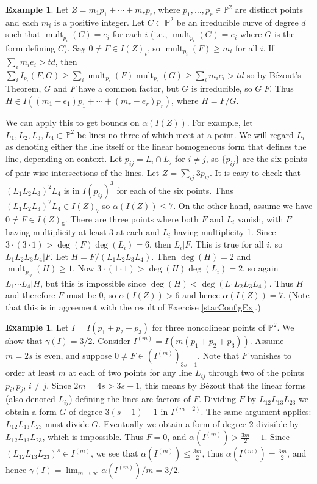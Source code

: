 \documentclass[11pt,twoside]{amsart}
\numberwithin{equation}{section}
\theoremstyle{definition}
\newtheorem{example}[theorem]{Example}
\begin{document}
\begin{example}\label{AlphaAndBezout}
Let $Z=m_1p_1+\cdots+m_rp_r$, where $p_1,\ldots,p_r\in{\mathbb{P}^{2}}$ 
are distinct points and each $m_i$ is a positive integer.
Let $C\subset{\mathbb{P}^{2}}$ be an irreducible curve of degree $d$
such that ${\operatorname{mult}}_{p_i}(C)=e_i$ for each $i$ (i.e., ${\operatorname{mult}}_{p_i}(G)=e_i$
where $G$ is the form defining $C$).
Say $0\neq F\in I(Z)_t$, so ${\operatorname{mult}}_{p_i}(F)\geq m_i$ for all $i$.
If $\sum_im_ie_i>td$, then
$\sum_iI_{p_i}(F,G)\geq \sum_i{\operatorname{mult}}_{p_i}(F){\operatorname{mult}}_{p_i}(G)\geq\sum_im_ie_i > td$ so by B\'ezout's Theorem,
$G$ and $F$ have a common factor, but $G$ is irreducible, so
$G|F$. Thus $H\in I((m_1-e_1)p_1+\cdots+(m_r-e_r)p_r)$,
where $H=F/G$. 

We can apply this to get bounds on $\alpha(I(Z))$.
For example, let $L_1,L_2,L_3,L_4\subset{\mathbb{P}^{2}}$ be lines no three of which meet at a point.
We will regard $L_i$ as denoting either the line itself or the linear homogeneous form that defines the line,
depending on context.
Let $p_{ij}=L_i\cap L_j$ for $i\neq j$, so $\{p_{ij}\}$ are the six points of pair-wise intersections of the lines.
Let $Z=\sum_{ij}3p_{ij}$. It is easy to check that $(L_1L_2L_3)^2L_4$ is in $I(p_{ij})^3$ for each of the
six points. Thus $(L_1L_2L_3)^2L_4\in I(Z)_7$ so $\alpha(I(Z))\leq 7$.
On the other hand, assume we have $0\neq F\in I(Z)_6$.
There are three points where both $F$ and $L_i$ vanish, with $F$ 
having multiplicity at least 3 at each and $L_i$ having multiplicity 1.
Since $3\cdot (3\cdot 1)>\deg(F)\deg(L_i)=6$, then $L_i|F$. This is true for all
$i$, so $L_1L_2L_3L_4|F$. Let $H=F/(L_1L_2L_3L_4)$.
Then $\deg(H)=2$ and ${\operatorname{mult}}_{p_{ij}}(H)\geq 1$.
Now $3\cdot (1\cdot 1)>\deg(H)\deg(L_i)=2$, so again
$L_1\cdots L_4|H$, but this is impossible since $\deg(H)<\deg(L_1L_2L_3L_4)$.
Thus $H$ and therefore $F$ must be 0,
so $\alpha(I(Z))>6$ and hence $\alpha(I(Z))=7$.
(Note that this is in agreement with the result of Exercise \ref{starConfigEx}.)
\end{example}

\begin{example}
Let $I=I(p_1+p_2+p_3)$ for three noncolinear points of ${\mathbb{P}^{2}}$.
We show that $\gamma(I)=3/2$. Consider $I^{(m)}=I(m(p_1+p_2+p_3))$.
Assume $m=2s$ is even, and suppose $0\neq F\in (I^{(m)})_{3s-1}$.
Note that $F$ vanishes to order at least $m$ at each of two points
for any line $L_{ij}$ through two of the points $p_i, p_j$, $i\neq j$.
Since $2m=4s>3s-1$, this means by B\'ezout that the linear forms (also denoted $L_{ij}$)
defining the lines are factors of
$F$. Dividing $F$ by $L_{12}L_{13}L_{23}$ we obtain a form $G$ of degree $3(s-1)-1$
in $I^{(m-2)}$. The same argument applies: $L_{12}L_{13}L_{23}$ must divide $G$.
Eventually we obtain a form of degree 2 divisible by $L_{12}L_{13}L_{23}$, which is impossible.
Thus $F=0$, and $\alpha(I^{(m)})> \frac{3m}{2}-1$. Since $(L_{12}L_{13}L_{23})^s\in I^{(m)}$,
we see that $\alpha(I^{(m)})\leq \frac{3m}{2}$, thus $\alpha(I^{(m)})=\frac{3m}{2}$, and hence
$\gamma(I)=\lim_{m\to\infty}\alpha(I^{(m)})/m=3/2$.
\end{example}
\end{document}

